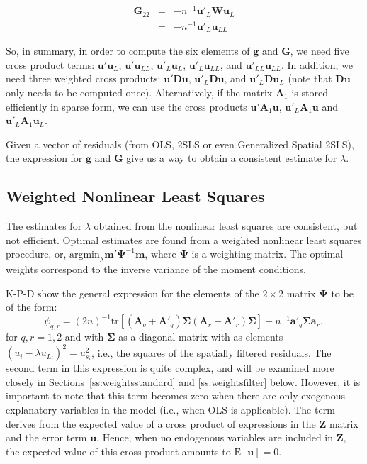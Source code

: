 \documentclass{article}
\begin{document}
\begin{eqnarray}
 \mathbf{G}_{22} &=& - n^{-1} \mathbf{u'}_L \mathbf{W} \mathbf{u}_L \label{eq:G22}\\
    &=& - n^{-1} \mathbf{u'}_L \mathbf{u}_{LL}\nonumber
\end{eqnarray}

So, in summary, in order to compute the six elements of $\mathbf{g}$ and $\mathbf{G}$,
we need five cross product terms: $\mathbf{u'} \mathbf{u}_L$, $\mathbf{u'} \mathbf{u}_{LL}$,
$\mathbf{u'}_L \mathbf{u}_L$, $\mathbf{u'}_L \mathbf{u}_{LL}$, and
$\mathbf{u'}_{LL} \mathbf{u}_{LL}$. In addition, we need three weighted cross products:
$\mathbf{u'} \mathbf{D} \mathbf{u}$, $\mathbf{u'}_L \mathbf{D} \mathbf{u}$, and
$\mathbf{u'}_L \mathbf{D} \mathbf{u}_L$ (note that $\mathbf{Du}$ only needs to be
computed once). Alternatively, if the matrix $\mathbf{A}_1$ is stored efficiently in sparse form,
we can use the cross products $\mathbf{u'}\mathbf{A}_1 \mathbf{u}$, $\mathbf{u'}_L \mathbf{A}_1 \mathbf{u}$ and $\mathbf{u'}_L \mathbf{A}_1 \mathbf{u}_L$.

Given a vector of residuals (from OLS, 2SLS or even Generalized Spatial 2SLS), the expression
for $\mathbf{g}$ and $\mathbf{G}$ give us a way to obtain a consistent estimate for $\lambda$.

\subsection{Weighted Nonlinear Least Squares}\label{ss:weightedgmm}
The estimates for $\lambda$ obtained from the nonlinear least squares are consistent,
but not efficient. Optimal estimates are found from a weighted nonlinear least squares
procedure, or, $\mbox{argmin}_\lambda \mathbf{m'}\mathbf{\mathbf{\Psi}}^{-1} \mathbf{m}$, where $\mathbf{\Psi}$ is a weighting matrix.
The optimal weights correspond to the inverse variance of the moment conditions.

K-P-D show the general expression for the elements of the $2 \times 2$ matrix $\mathbf{\Psi}$ to
be of the form:
\begin{equation}\label{eq:psiqr}
\psi_{q,r} = (2n)^{-1} \mbox{tr} [ (\mathbf{A}_q + \mathbf{A'}_q ) \mathbf{\mathbf{\Sigma}}  (\mathbf{A}_r + \mathbf{A'}_r ) \mathbf{\Sigma} ] + n^{-1} \mathbf{a'}_q \mathbf{\Sigma} \mathbf{a}_r,
\end{equation}
for $q, r = 1,2$ and with $\mathbf{\Sigma}$ as a diagonal matrix with as elements 
$(u_i - \lambda u_{L_i})^2 = u_{s_i}^2$, i.e., the squares of the spatially filtered residuals.
The second term in this expression is quite complex, and will be examined more closely 
in Sections~\ref{ss:weightsstandard} and \ref{ss:weightsfilter} below.
However, it is important to note that this term becomes zero when there are only exogenous
explanatory variables in the model (i.e., when OLS is applicable). The term derives from the
expected value of a cross
product of expressions in the $\mathbf{Z}$ matrix and the error term $\mathbf{u}$. Hence,
when no endogenous variables are included in $\mathbf{Z}$, the expected value of this
cross product amounts to $\mbox{E}[ \mathbf{u} ] = 0$.
\end{document}
